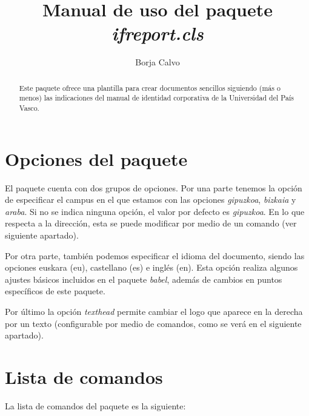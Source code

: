 \documentclass[es]{ifreport}
\begin{document}
\title{Manual de uso del paquete \textit{ifreport.cls}}
\author{Borja Calvo}

\maketitle

\begin{abstract}
Este paquete ofrece una plantilla para crear documentos sencillos siguiendo (m\'as o menos) las indicaciones del manual de identidad corporativa de la Universidad del Pa\'is Vasco.
\end{abstract}

\section{Opciones del paquete}
El paquete cuenta con dos grupos de opciones. Por una parte tenemos la opci\'on de especificar el campus en el que estamos con las opciones \textit{gipuzkoa}, \textit{bizkaia} y \textit{araba}. Si no se indica ninguna opci\'on, el valor por defecto es \textit{gipuzkoa}. En lo que respecta a la direcci\'on, esta se puede modificar por medio de un comando (ver siguiente apartado).

Por otra parte, tambi\'en podemos especificar el idioma del documento, siendo las opciones euskara (eu), castellano (es) e ingl\'es (en). Esta opci\'on realiza algunos ajustes b\'asicos incluidos en el paquete \textit{babel}, adem\'as de cambios en puntos espec\'ificos de este paquete.

Por \'ultimo la opci\'on \textit{texthead} permite cambiar el logo que aparece en la derecha por un texto (configurable por medio de comandos, como se ver\'a en el siguiente apartado).
\section{Lista de comandos}

La lista de comandos del paquete es la siguiente:
\end{document}
